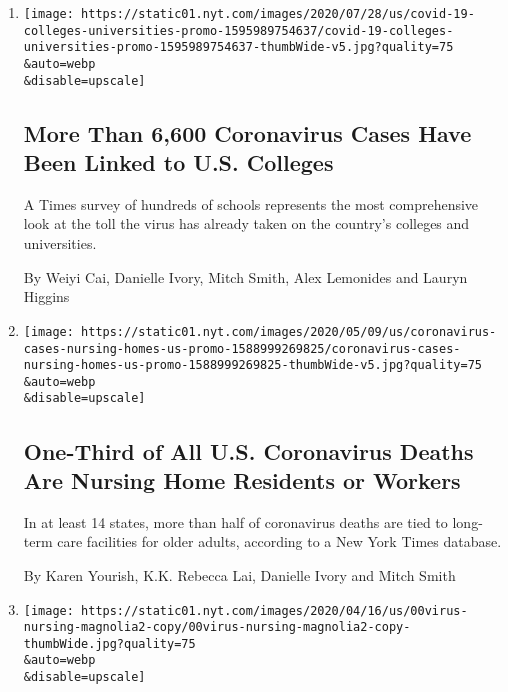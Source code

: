 \begin{enumerate}
\def\labelenumi{\arabic{enumi}.}
\item
  \href{/interactive/2020/07/28/us/covid-19-colleges-universities.html}{}

  \texttt{[image: https://static01.nyt.com/images/2020/07/28/us/covid-19-colleges-universities-promo-1595989754637/covid-19-colleges-universities-promo-1595989754637-thumbWide-v5.jpg?quality=75\\\&auto=webp\\\&disable=upscale]}

  \hypertarget{more-than-6600-coronavirus-cases-have-been-linked-to-us-colleges}{%
  \subsection{More Than 6,600 Coronavirus Cases Have Been Linked to U.S.
  Colleges}\label{more-than-6600-coronavirus-cases-have-been-linked-to-us-colleges}}

  A Times survey of hundreds of schools represents the most
  comprehensive look at the toll the virus has already taken on the
  country's colleges and universities.

  By Weiyi Cai, Danielle Ivory, Mitch Smith, Alex Lemonides and Lauryn
  Higgins
\item
  \href{/interactive/2020/05/09/us/coronavirus-cases-nursing-homes-us.html}{}

  \texttt{[image: https://static01.nyt.com/images/2020/05/09/us/coronavirus-cases-nursing-homes-us-promo-1588999269825/coronavirus-cases-nursing-homes-us-promo-1588999269825-thumbWide-v5.jpg?quality=75\\\&auto=webp\\\&disable=upscale]}

  \hypertarget{one-third-of-all-us-coronavirus-deaths-are-nursing-home-residents-or-workers}{%
  \subsection{One-Third of All U.S. Coronavirus Deaths Are Nursing Home
  Residents or
  Workers}\label{one-third-of-all-us-coronavirus-deaths-are-nursing-home-residents-or-workers}}

  In at least 14 states, more than half of coronavirus deaths are tied
  to long-term care facilities for older adults, according to a New York
  Times database.

  By Karen Yourish, K.K. Rebecca Lai, Danielle Ivory and Mitch Smith
\item
  \href{/2020/04/17/us/coronavirus-nursing-homes.html}{}

  \texttt{[image: https://static01.nyt.com/images/2020/04/16/us/00virus-nursing-magnolia2-copy/00virus-nursing-magnolia2-copy-thumbWide.jpg?quality=75\\\&auto=webp\\\&disable=upscale]}


\end{enumerate}
